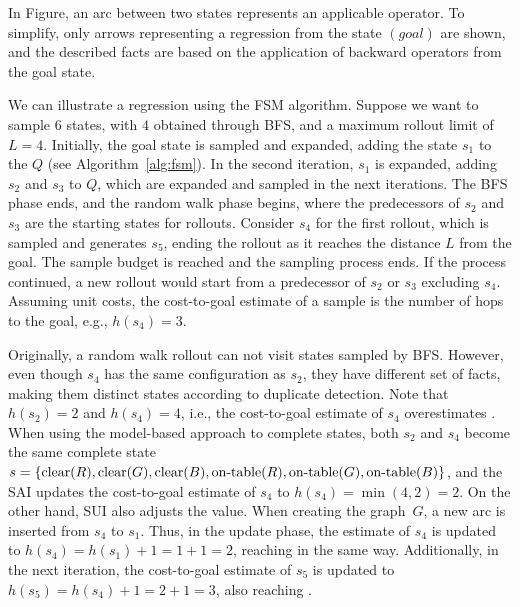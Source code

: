 \begin{figure}[ht]
\end{figure}

In Figure, an arc between two states represents an applicable operator.
To simplify, only arrows representing a regression from the state $(goal)$ are shown, and the described facts are based on the application of backward operators from the goal state.

We can illustrate a regression using the FSM algorithm. Suppose we want to sample $6$ states, with $4$ obtained through BFS, and a maximum rollout limit of $L=4$. Initially, the goal state is sampled and expanded, adding the state $s_1$ to the $Q$ (see Algorithm~\ref{alg:fsm}). In the second iteration, $s_1$ is expanded, adding $s_2$ and $s_3$ to $Q$, which are expanded and sampled in the next iterations. The BFS phase ends, and the random walk phase begins, where the predecessors of $s_2$ and $s_3$ are the starting states for rollouts. Consider $s_4$ for the first rollout, which is sampled and generates $s_5$, ending the rollout as it reaches the distance $L$ from the goal. The sample budget is reached and the sampling process ends. If the process continued, a new rollout would start from a predecessor of $s_2$ or $s_3$ excluding $s_4$. Assuming unit costs, the cost-to-goal estimate of a sample is the number of hops to the goal, e.g., $h(s_4)=3$.

Originally, a random walk rollout can not visit states sampled by BFS. However, even though $s_4$ has the same configuration as $s_2$, they have different set of facts, making them distinct states according to duplicate detection. Note that $h(s_2)=2$ and $h(s_4)=4$, i.e., the cost-to-goal estimate of $s_4$ overestimates \hstar. When using the model-based approach to complete states, both $s_2$ and $s_4$ become the same complete state $s = \{\text{clear}(R),\text{clear}(G),\text{clear}(B),\text{on-table}(R),\text{on-table}(G),\text{on-table}(B)\}$, and the SAI updates the cost-to-goal estimate of $s_4$ to $h(s_4)=\min(4,2)=2$. On the other hand, SUI also adjusts the value. When creating the graph~$G$, a new arc is inserted from $s_4$ to $s_1$. Thus, in the update phase, the estimate of $s_4$ is updated to $h(s_4)=h(s_1)+1=1+1=2$, reaching \hstar in the same way. Additionally, in the next iteration, the cost-to-goal estimate of $s_5$ is updated to $h(s_5)=h(s_4)+1=2+1=3$, also reaching \hstar.
